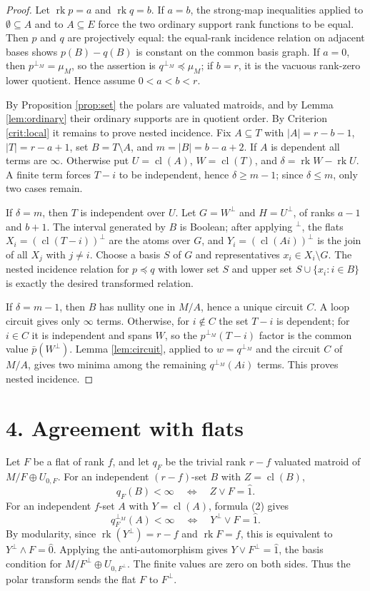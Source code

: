 \documentclass[12pt]{article}
\newcommand{\rk}{\operatorname{rk}}
\newcommand{\cl}{\operatorname{cl}}
\begin{document}
\begin{proof}
Let $\rk p=a$ and $\rk q=b$.  If $a=b$, the strong-map inequalities applied to
$\emptyset\subseteq A$ and to $A\subseteq E$ force the two ordinary
support rank functions to be equal.  Then $p$ and $q$ are projectively
equal: the equal-rank incidence relation on adjacent bases shows
$p(B)-q(B)$ is constant on the common basis graph.  If $a=0$, then $p^{\perp_M}=\mu_M$, so the
assertion is $q^{\perp_M}\preceq\mu_M$; if $b=r$, it is the vacuous
rank-zero lower quotient.  Hence assume $0<a<b<r$.

By Proposition \ref{prop:set} the polars are valuated matroids, and by
Lemma \ref{lem:ordinary} their ordinary supports are in quotient order.
By Criterion \ref{crit:local} it remains to prove nested incidence.
Fix $A\subseteq T$ with
$|A|=r-b-1$, $|T|=r-a+1$, set $B=T\setminus A$, and
$m=|B|=b-a+2$.  If $A$ is dependent all terms are $\infty$.  Otherwise
put $U=\cl(A)$, $W=\cl(T)$, and $\delta=\rk W-\rk U$.  A finite term
forces $T-i$ to be independent, hence $\delta\ge m-1$; since
$\delta\le m$, only two cases remain.

If $\delta=m$, then $T$ is independent over $U$.  Let $G=W^\perp$ and
$H=U^\perp$, of ranks $a-1$ and $b+1$.  The interval generated by $B$
is Boolean; after applying $^\perp$, the flats
$X_i=(\cl(T-i))^\perp$ are the atoms over $G$, and
$Y_i=(\cl(Ai))^\perp$ is the join of all $X_j$ with $j\ne i$.  Choose a
basis $S$ of $G$ and representatives $x_i\in X_i\setminus G$.  The
nested incidence relation for $p\preceq q$ with lower set $S$ and upper
set $S\cup\{x_i:i\in B\}$ is exactly the desired transformed relation.

If $\delta=m-1$, then $B$ has nullity one in $M/A$, hence a unique
circuit $C$.  A loop circuit gives only $\infty$ terms.  Otherwise, for
$i\notin C$ the set $T-i$ is dependent; for $i\in C$ it is independent
and spans $W$, so the $p^{\perp_M}(T-i)$ factor is the common value
$\bar p(W^\perp)$.  Lemma \ref{lem:circuit}, applied to
$w=q^{\perp_M}$ and the circuit $C$ of $M/A$, gives two minima among
the remaining $q^{\perp_M}(Ai)$ terms.  This proves nested incidence.
\end{proof}

\section*{4. Agreement with flats}

Let $F$ be a flat of rank $f$, and let $q_F$ be the trivial rank
$r-f$ valuated matroid of $M/F\oplus U_{0,F}$.  For an independent
$(r-f)$-set $B$ with $Z=\cl(B)$,
\[
        q_F(B)<\infty\quad\Longleftrightarrow\quad Z\vee F=\hat1.
\]
For an independent $f$-set $A$ with $Y=\cl(A)$, formula (2) gives
\[
 q_F^{\perp_M}(A)<\infty
 \quad\Longleftrightarrow\quad Y^\perp\vee F=\hat1 .
\]
By modularity, since $\rk(Y^\perp)=r-f$ and $\rk F=f$, this is
equivalent to $Y^\perp\wedge F=\hat0$.  Applying the anti-automorphism
gives $Y\vee F^\perp=\hat1$, the basis condition for
$M/F^\perp\oplus U_{0,F^\perp}$.  The finite values are zero on both
sides.  Thus the polar transform sends the flat $F$ to $F^\perp$.
\end{document}
